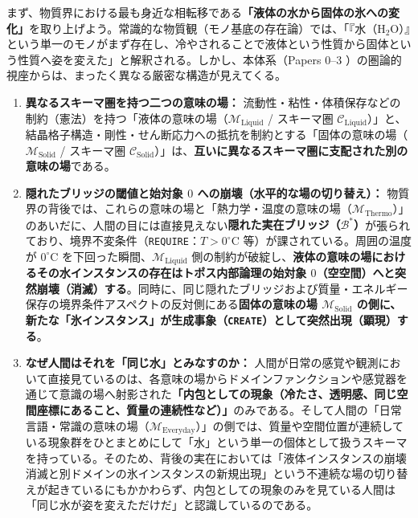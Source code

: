 \documentclass[11pt,a4paper]{ltjsarticle}
\theoremstyle{definition}
\theoremstyle{plain}
\begin{document}
まず、物質界における最も身近な相転移である\textbf{「液体の水から固体の氷への変化」}を取り上げよう。常識的な物質観（モノ基底の存在論）では、「『水（$\mathrm{H_2O}$）』という単一のモノがまず存在し、冷やされることで液体という性質から固体という性質へ姿を変えた」と解釈される。しかし、本体系（Papers 0--3 \cite{Ota2026_0,Ota2026_1,Ota2026_2,Ota2026_3}）の圏論的視座からは、まったく異なる厳密な構造が見えてくる。

\begin{enumerate}
    \item \textbf{異なるスキーマ圏を持つ二つの意味の場：}
    流動性・粘性・体積保存などの制約（憲法）を持つ「液体の意味の場（$\mathcal{M}_{\mathrm{Liquid}}$ / スキーマ圏 $\mathcal{C}_{\mathrm{Liquid}}$）」と、結晶格子構造・剛性・せん断応力への抵抗を制約とする「固体の意味の場（$\mathcal{M}_{\mathrm{Solid}}$ / スキーマ圏 $\mathcal{C}_{\mathrm{Solid}}$）」は、\textbf{互いに異なるスキーマ圏に支配された別の意味の場}である。
    \item \textbf{隠れたブリッジの閾値と始対象 $0$ への崩壊（水平的な場の切り替え）：}
    物質界の背後では、これらの意味の場と「熱力学・温度の意味の場（$\mathcal{M}_{\mathrm{Thermo}}$）」のあいだに、人間の目には直接見えない\textbf{隠れた実在ブリッジ（$\mathcal{B}^*$）}が張られており、境界不変条件（\texttt{REQUIRE}：$T > 0^\circ\mathrm{C}$ 等）が課されている。周囲の温度が $0^\circ\mathrm{C}$ を下回った瞬間、$\mathcal{M}_{\mathrm{Liquid}}$ 側の制約が破綻し、\textbf{液体の意味の場におけるその水インスタンスの存在はトポス内部論理の始対象 $0$（空空間）へと突然崩壊（消滅）する}。同時に、同じ隠れたブリッジおよび質量・エネルギー保存の境界条件アスペクトの反対側にある\textbf{固体の意味の場 $\mathcal{M}_{\mathrm{Solid}}$ の側に、新たな「氷インスタンス」が生成事象（\texttt{CREATE}）として突然出現（顕現）する}。
    \item \textbf{なぜ人間はそれを「同じ水」とみなすのか：}
    人間が日常の感覚や観測において直接見ているのは、各意味の場からドメインファンクションや感覚器を通じて意識の場へ射影された\textbf{「内包としての現象（冷たさ、透明感、同じ空間座標にあること、質量の連続性など）」}のみである。そして人間の「日常言語・常識の意味の場（$\mathcal{M}_{\mathrm{Everyday}}$）」の側では、質量や空間位置が連続している現象群をひとまとめにして「水」という単一の個体として扱うスキーマを持っている。そのため、背後の実在においては「液体インスタンスの崩壊消滅と別ドメインの氷インスタンスの新規出現」という不連続な場の切り替えが起きているにもかかわらず、内包としての現象のみを見ている人間は「同じ水が姿を変えただけだ」と認識しているのである。
\end{enumerate}
\end{document}
